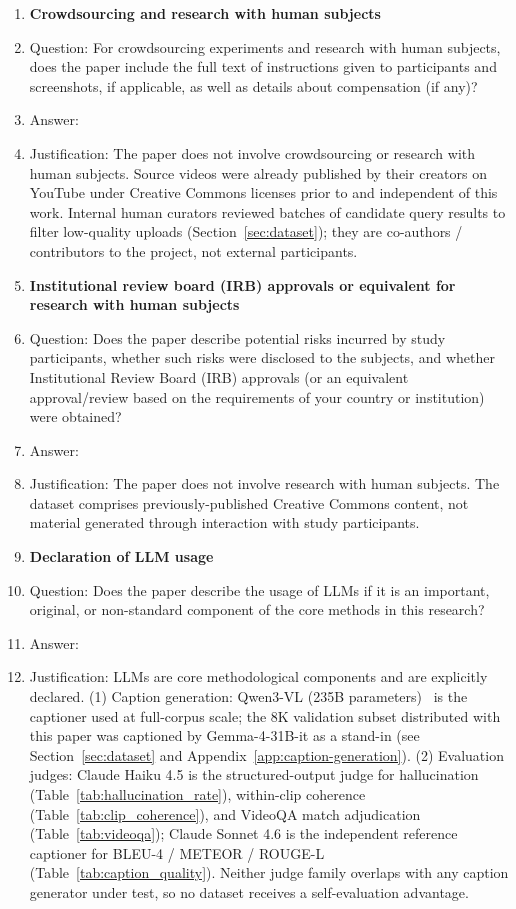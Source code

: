 \begin{enumerate}
\item {\bf Crowdsourcing and research with human subjects}
    \item[] Question: For crowdsourcing experiments and research with human subjects, does the paper include the full text of instructions given to participants and screenshots, if applicable, as well as details about compensation (if any)?
    \item[] Answer: \answerNA{}
    \item[] Justification: The paper does not involve crowdsourcing or research with human subjects. Source videos were already published by their creators on YouTube under Creative Commons licenses prior to and independent of this work. Internal human curators reviewed batches of candidate query results to filter low-quality uploads (Section~\ref{sec:dataset}); they are co-authors / contributors to the project, not external participants.

\item {\bf Institutional review board (IRB) approvals or equivalent for research with human subjects}
    \item[] Question: Does the paper describe potential risks incurred by study participants, whether such risks were disclosed to the subjects, and whether Institutional Review Board (IRB) approvals (or an equivalent approval/review based on the requirements of your country or institution) were obtained?
    \item[] Answer: \answerNA{}
    \item[] Justification: The paper does not involve research with human subjects. The dataset comprises previously-published Creative Commons content, not material generated through interaction with study participants.

\item {\bf Declaration of LLM usage}
    \item[] Question: Does the paper describe the usage of LLMs if it is an important, original, or non-standard component of the core methods in this research?
    \item[] Answer: \answerYes{}
    \item[] Justification: LLMs are core methodological components and are explicitly declared. (1) Caption generation: Qwen3-VL (235B parameters)~\cite{qwen3vxl} is the captioner used at full-corpus scale; the 8K validation subset distributed with this paper was captioned by Gemma-4-31B-it as a stand-in (see Section~\ref{sec:dataset} and Appendix~\ref{app:caption-generation}). (2) Evaluation judges: Claude Haiku 4.5 is the structured-output judge for hallucination (Table~\ref{tab:hallucination_rate}), within-clip coherence (Table~\ref{tab:clip_coherence}), and VideoQA match adjudication (Table~\ref{tab:videoqa}); Claude Sonnet 4.6 is the independent reference captioner for BLEU-4 / METEOR / ROUGE-L (Table~\ref{tab:caption_quality}). Neither judge family overlaps with any caption generator under test, so no dataset receives a self-evaluation advantage.

\end{enumerate}
